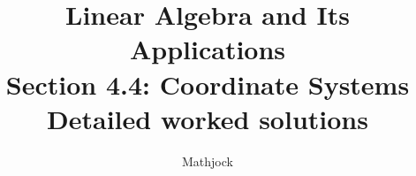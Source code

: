 
\title{\textbf{Linear Algebra and Its Applications}\\[0.3em]Section 4.4: Coordinate Systems\\[0.3em]\large Detailed worked solutions}
\author{Mathjock}
\date{}

\maketitle
\bookinfo
\tableofcontents
\clearpage
\renewcommand{\thesection}{4.\arabic{section}}
\renewcommand{\theHsection}{4.\arabic{section}}
\setcounter{section}{3}



